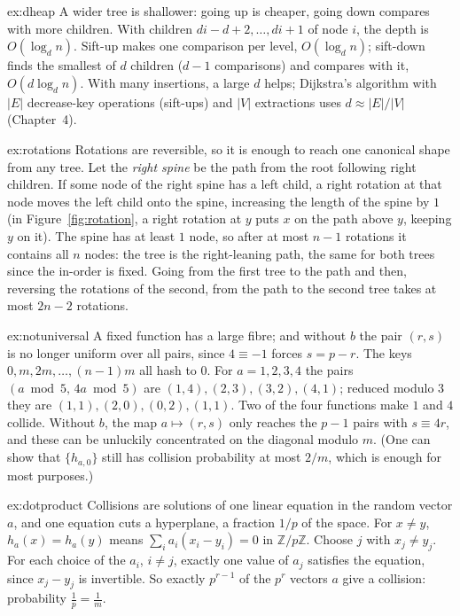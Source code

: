 \begin{solution}{ex:dheap}
\idea A wider tree is shallower: going up is cheaper, going down compares with more children.
\writeup With children $di-d+2,\dots,di+1$ of node $i$, the depth is $O(\log_dn)$. Sift-up makes one comparison per level, $O(\log_dn)$; sift-down finds the smallest of $d$ children
($d-1$ comparisons) and compares with it, $O(d\log_dn)$. With many insertions, a large $d$ helps; Dijkstra's algorithm with $|E|$ decrease-key operations (sift-ups) and $|V|$
extractions uses $d\approx|E|/|V|$ (Chapter~4).
\end{solution}

\begin{solution}{ex:rotations}
\idea Rotations are reversible, so it is enough to reach one canonical shape from any tree.
\writeup Let the \emph{right spine} be the path from the root following right children. If some node of the right spine has a left child, a right rotation at that node moves the left
child onto the spine, increasing the length of the spine by $1$ (in Figure~\ref{fig:rotation}, a right rotation at $y$ puts $x$ on the path above $y$, keeping $y$ on it). The spine has at
least $1$ node, so after at most $n-1$ rotations it contains all $n$ nodes: the tree is the right-leaning path, the same for both trees since the in-order is fixed. Going from the
first tree to the path and then, reversing the rotations of the second, from the path to the second tree takes at most $2n-2$ rotations.
\end{solution}

\begin{solution}{ex:notuniversal}
\idea A fixed function has a large fibre; and without $b$ the pair $(r,s)$ is no longer uniform over all pairs, since $4\equiv-1$ forces $s=p-r$.
\writeup The keys $0,m,2m,\dots,(n-1)m$ all hash to $0$. For $a=1,2,3,4$ the pairs $(a\bmod5,\,4a\bmod5)$ are $(1,4),(2,3),(3,2),(4,1)$; reduced modulo $3$ they are $(1,1),(2,0),(0,2),(1,1)$. Two
of the four functions make $1$ and $4$ collide. Without $b$, the map $a\mapsto(r,s)$ only reaches the $p-1$ pairs with $s\equiv4r$, and these can be unluckily concentrated on the diagonal
modulo $m$. (One can show that $\{h_{a,0}\}$ still has collision probability at most $2/m$, which is enough for most purposes.)
\end{solution}

\begin{solution}{ex:dotproduct}
\idea Collisions are solutions of one linear equation in the random vector $a$, and one equation cuts a hyperplane, a fraction $1/p$ of the space.
\writeup For $x\ne y$, $h_a(x)=h_a(y)$ means $\sum_ia_i(x_i-y_i)=0$ in $\mathbb Z/p\mathbb Z$. Choose $j$ with $x_j\ne y_j$. For each choice of the $a_i$, $i\ne j$, exactly one value of $a_j$ satisfies the
equation, since $x_j-y_j$ is invertible. So exactly $p^{r-1}$ of the $p^r$ vectors $a$ give a collision: probability $\frac1p=\frac1m$.
\end{solution}

